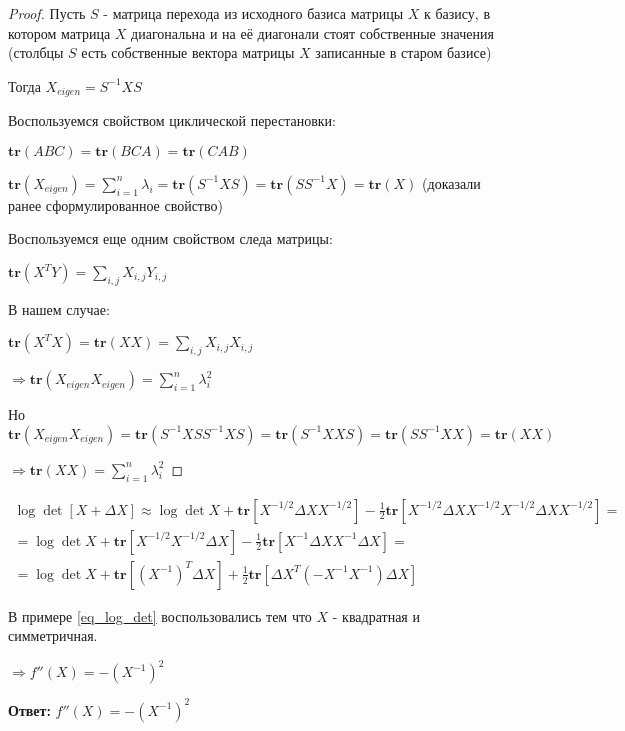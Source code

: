 \documentclass[a4paper,12pt]{article}
\newcommand{\lt}{\left}
\newcommand{\rt}{\right}
\newcommand{\fr}{\frac}
\newcommand{\mbf}{\mathbf}
\begin{document}
\begin{proof}

Пусть $S$ - матрица перехода из исходного базиса матрицы $X$ к базису, в котором матрица $X$ диагональна и на её диагонали стоят собственные значения (столбцы $S$ есть собственные вектора матрицы $X$ записанные в старом базисе)

Тогда $X_{eigen} = S^{-1}XS$

Воспользуемся свойством циклической перестановки: 

$\mathbf{tr}(ABC) = \mathbf{tr}(BCA) =\mathbf{tr}(CAB)$

$\mathbf{tr}(X_{eigen}) = \sum\limits_{i=1}^n \lambda_i = \mathbf{tr}(S^{-1}XS)= \mathbf{tr}(SS^{-1}X)= \mbf{tr}(X)$ (доказали ранее сформулированное свойство)

Воспользуемся еще одним свойством следа матрицы: 

$ \mbf{tr}(X^TY) = \sum\limits_{i,j} X_{i,j}Y_{i,j}$

В нашем случае:

$ \mbf{tr}(X^TX) = \mbf{tr}(XX) = \sum\limits_{i,j} X_{i,j}X_{i,j}$

$\Rightarrow \mbf{tr}(X_{eigen}X_{eigen}) = \sum\limits_{i=1}^n  \lambda_i^2$

Но $\mbf{tr}(X_{eigen}X_{eigen}) = \mbf{tr}(S^{-1}XSS^{-1}XS) = \mbf{tr}(S^{-1}XXS) = \mbf{tr}(SS^{-1}XX) = \mbf{tr}(XX)$ 

$\Rightarrow \mbf{tr}(XX) =\sum\limits_{i=1}^n \lambda_i^2$
\end{proof}
\begin{multline}\label{eq_log_det}
\log\det\left[ X+ \Delta X\right] \approx \log\det X + \mathbf{tr}\left[X^{-1/2} \Delta X X^{-1/2}\right] - \fr{1}{2}\mbf{tr}\lt[X^{-1/2} \Delta X X^{-1/2}X^{-1/2} \Delta X X^{-1/2}\rt]
=\\= 
\log\det X + \mathbf{tr}\left[X^{-1/2} X^{-1/2} \Delta X \right] - \fr{1}{2}\mbf{tr}\lt[X^{-1} \Delta X X^{-1} \Delta X \rt] =\\= \log\det X + \mathbf{tr}\left[\lt(X^{-1}\rt)^T\Delta X \right] + \fr{1}{2}\mbf{tr}\lt[\Delta X^T \lt(-X^{-1} X^{-1}\rt) \Delta X \rt]
\end{multline}

В примере \eqref{eq_log_det} воспользовались тем что $X$ - квадратная и симметричная.

$\Rightarrow f''(X) = -\lt(X^{-1}\rt)^2$

\vspace{\baselineskip}

\textbf{Ответ:} $f''(X) = -\lt(X^{-1}\rt)^2$
\end{document}
